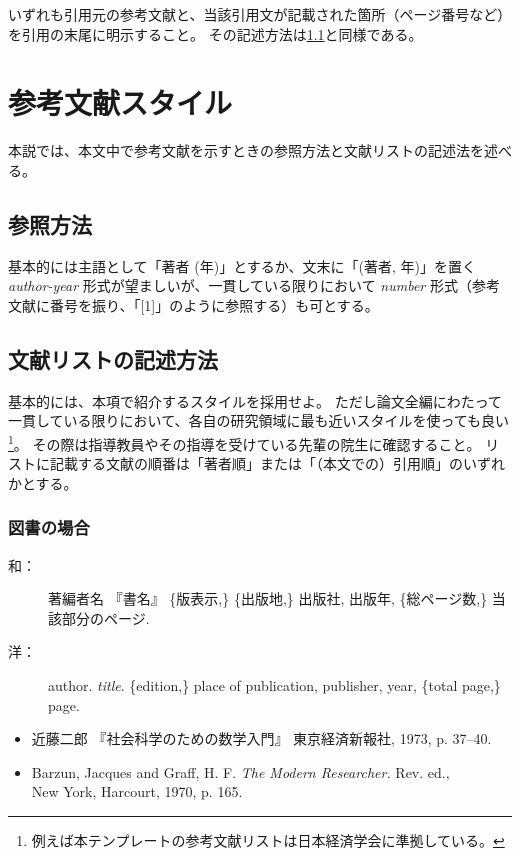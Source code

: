 			\noindent
			いずれも引用元の参考文献と、当該引用文が記載された箇所（ページ番号など）を引用の末尾に明示すること。
			その記述方法は\cref{sub:ref_style}と同様である。


	\section{参考文献スタイル}
		\label{sec:bib_style}

		本説では、本文中で参考文献を示すときの参照方法と文献リストの記述法を述べる。

		\subsection{参照方法}
			\label{sub:ref_style}

			基本的には主語として「著者 (年)」とするか、文末に「(著者, 年)」を置く \emph{author-year} 形式が望ましいが、一貫している限りにおいて \emph{number} 形式（参考文献に番号を振り、「[1]」のように参照する）も可とする。

		\subsection{文献リストの記述方法}
			\label{sub:ref_list_sylte}

			基本的には、本項で紹介するスタイルを採用せよ。
			ただし論文全編にわたって一貫している限りにおいて、各自の研究領域に最も近いスタイルを使っても良い
			\footnote{例えば本テンプレートの参考文献リストは日本経済学会に準拠している。}。
			その際は指導教員やその指導を受けている先輩の院生に確認すること。
			リストに記載する文献の順番は「著者順」または「（本文での）引用順」のいずれかとする。


		\subsubsection{図書の場合}

			\begin{description}
				\item[和：] 著編者名 『書名』 \{版表示,\} \{出版地,\} 出版社, 出版年, \{総ページ数,\} 当該部分のページ.
				\item[洋：] author. \textit{title}. \{edition,\} place of publication, publisher, year, \{total page,\} page.
			\end{description}

			\begin{screen} \begin{itemize}
				\item 近藤二郎 『社会科学のための数学入門』 東京経済新報社, 1973,
				p. 37--40.

				\item Barzun, Jacques and Graff, H. F. \textit{The Modern Researcher.}
				Rev. ed., \\New York, Harcourt, 1970, p. 165.
			\end{itemize} \end{screen}


